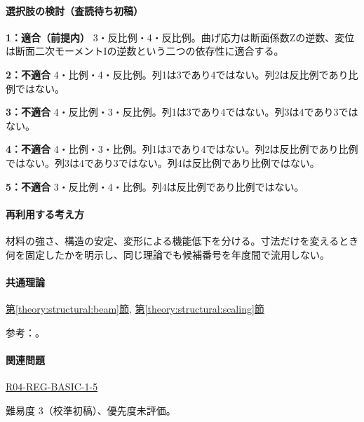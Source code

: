 \paragraph{選択肢の検討（査読待ち初稿）}\mbox{}\par

\noindent\textbf{1：適合（前提内）} 3・反比例・4・反比例。曲げ応力は断面係数Zの逆数、変位は断面二次モーメントIの逆数という二つの依存性に適合する。\par

\noindent\textbf{2：不適合} 4・比例・4・反比例。列1は3であり4ではない。列2は反比例であり比例ではない。\par

\noindent\textbf{3：不適合} 4・反比例・3・反比例。列1は3であり4ではない。列3は4であり3ではない。\par

\noindent\textbf{4：不適合} 4・比例・3・比例。列1は3であり4ではない。列2は反比例であり比例ではない。列3は4であり3ではない。列4は反比例であり比例ではない。\par

\noindent\textbf{5：不適合} 3・反比例・4・比例。列4は反比例であり比例ではない。\par

\paragraph{再利用する考え方} 材料の強さ、構造の安定、変形による機能低下を分ける。寸法だけを変えるとき何を固定したかを明示し、同じ理論でも候補番号を年度間で流用しない。

\paragraph{共通理論} \hyperref[theory:structural:beam]{第\ref*{theory:structural:beam}節}, \hyperref[theory:structural:scaling]{第\ref*{theory:structural:scaling}節}

\par 参考：\cite{struct_mit_beam,struct_mit_buckling,struct_mlit_limit}。

\paragraph{関連問題} \hyperref[q:r04-reg-basic-1-5]{R04-REG-BASIC-1-5}

\par 難易度 3（校準初稿）、優先度未評価。

